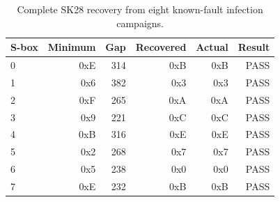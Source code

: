 \begin{table}[t]
\centering
\caption{Complete SK28 recovery from eight known-fault infection campaigns.}
\label{tab:s3-final-recovery}
\begin{tabular}{lrrrrr}
\toprule
S-box & Minimum & Gap & Recovered & Actual & Result \\
\midrule
0 & 0xE & 314 & 0xB & 0xB & PASS \\
1 & 0x6 & 382 & 0x3 & 0x3 & PASS \\
2 & 0xF & 265 & 0xA & 0xA & PASS \\
3 & 0x9 & 221 & 0xC & 0xC & PASS \\
4 & 0xB & 316 & 0xE & 0xE & PASS \\
5 & 0x2 & 268 & 0x7 & 0x7 & PASS \\
6 & 0x5 & 238 & 0x0 & 0x0 & PASS \\
7 & 0xE & 232 & 0xB & 0xB & PASS \\
\bottomrule
\end{tabular}
\end{table}
